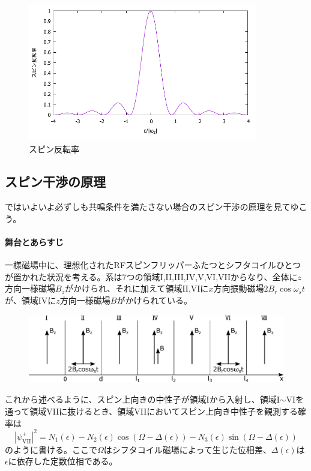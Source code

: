 \begin{figure}[H]
\begin{center}
\includegraphics[width=10cm]{nonreso/nonreso_reversalrate.pdf}
\caption{スピン反転率}
\label{Nonreso_fig_reversalrate}
\end{center}
\end{figure}


\subsection{スピン干渉の原理}
ではいよいよ必ずしも共鳴条件を満たさない場合のスピン干渉の原理を見てゆこう。

\paragraph{舞台とあらすじ}
一様磁場中に、理想化されたRFスピンフリッパーふたつとシフタコイルひとつが置かれた状況を考える。系は7つの領域I,II,III,IV,V,VI,VIIからなり、全体に$z$方向一様磁場$B_z$がかけられ、それに加えて領域II,VIに$x$方向振動磁場$2B_r\cos\omega_s t$が、領域IVに$z$方向一様磁場$B$がかけられている。
\begin{figure}[h]
\centering
\includegraphics[height=3cm]{nonreso/resonance_setting2.pdf}
\end{figure}

これから述べるように、スピン上向きの中性子が領域Iから入射し、領域I$\sim$VIを通って領域VIIに抜けるとき、領域VIIにおいてスピン上向き中性子を観測する確率は
\begin{equation}
|\psi_\mathrm{VII}^+|^2=N_1(\epsilon)-N_2(\epsilon) \cos (\Omega -\Delta(\epsilon)) -N_3(\epsilon) \sin(\Omega-\Delta(\epsilon)) \label{Nonreso_interference}
\end{equation}
のように書ける。ここで$\Omega$はシフタコイル磁場によって生じた位相差、$\Delta(\epsilon)$は$\epsilon$に依存した定数位相である。

